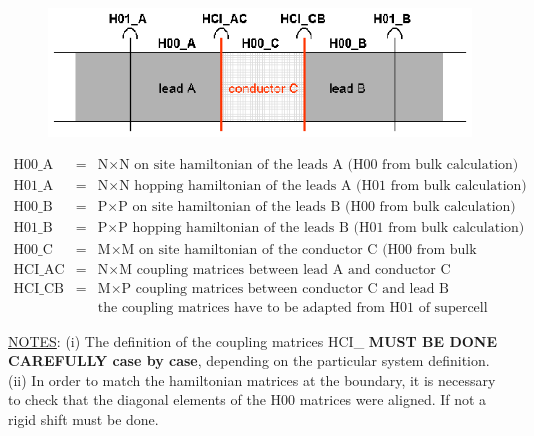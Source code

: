 \begin{figure}[h]
\includegraphics{acb}\label{acb:ham}
\end{figure}
\begin{displaymath}
\begin{array}{lll}
\textrm{H00\_A} &=& \textrm{N}\times\textrm{N on site hamiltonian
of the leads A (H00 from bulk calculation)}\\
\textrm{H01\_A} &=& \textrm{N}\times\textrm{N hopping hamiltonian
of the leads A (H01 from bulk calculation)}\\
\textrm{H00\_B} &=& \textrm{P}\times\textrm{P on site hamiltonian
of the leads B (H00 from bulk calculation)}\\
\textrm{H01\_B} &=& \textrm{P}\times\textrm{P hopping hamiltonian
of the leads B (H01 from bulk calculation)}\\
\textrm{H00\_C} &=& \textrm{M}\times\textrm{M on site hamiltonian
of the conductor C (H00 from bulk calculation)}\\
\textrm{HCI\_AC} &=& \textrm{N}\times\textrm{M coupling matrices
between lead A and conductor C}\\
\textrm{HCI\_CB} &=& \textrm{M}\times\textrm{P coupling matrices
between conductor C and lead B}\\
\textrm{ } &\textrm{ }& \textrm{the coupling matrices have to be
adapted from H01 of supercell calculation}
\end{array}
\end{displaymath}

\noindent \underline{NOTES}: (i) The definition of the coupling
matrices HCI\_ {\bf MUST BE DONE CAREFULLY case by case},
depending on the particular system definition. (ii) In order to
match the hamiltonian matrices at the boundary, it is necessary to
check that the diagonal elements of the H00 matrices were aligned.
If not a rigid shift must be done.
